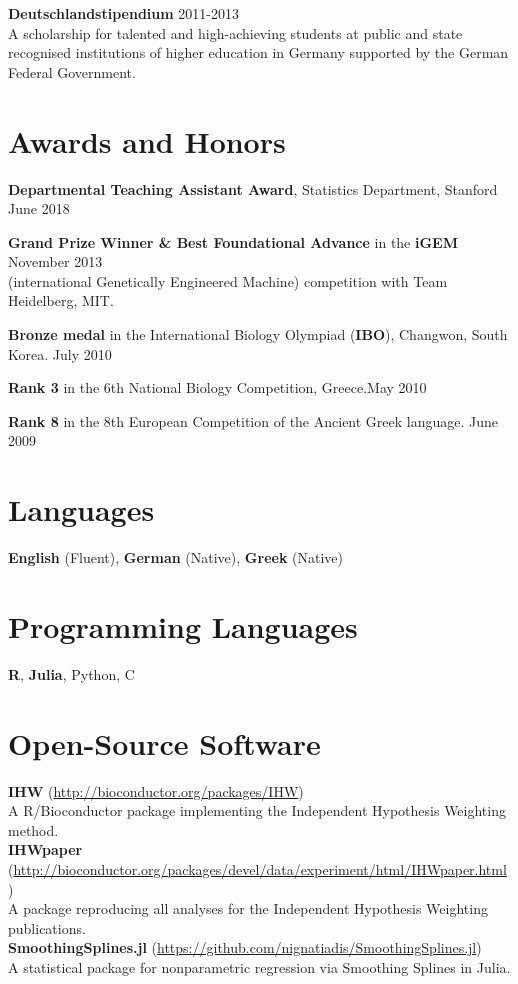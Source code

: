 \documentclass[margin,line]{res}
\newcommand{\ver}{\vspace*{-2.7mm}}
\begin{document}
\begin{resume}
\textbf{Deutschlandstipendium} \hfill 2011-2013\\
A scholarship for talented and high-achieving students at public and state recognised institutions of higher education in Germany supported by the German Federal Government.


\section{\sc Awards and Honors}
\textbf{Departmental Teaching Assistant Award}, Statistics Department, Stanford \hfill June 2018

\textbf{Grand Prize Winner \& Best Foundational Advance} in the \textbf{iGEM} \hfill November 2013 \\
(international Genetically Engineered Machine) competition with Team Heidelberg, MIT.

\ver
\textbf{Bronze medal} in the International Biology Olympiad (\textbf{IBO}), Changwon, South Korea. \hfill July 2010

\ver
\textbf{Rank 3} in the 6th National Biology Competition, Greece.\hfill May 2010
\ver

\textbf{Rank 8} in the 8th European Competition of the Ancient Greek language. \hfill June 2009




\section{\sc Languages}
\textbf{English} (Fluent), \textbf{German} (Native), \textbf{Greek} (Native)


\section{\sc Programming Languages}
\textbf{R}, \textbf{Julia}, Python, C


\section{\sc Open-Source Software}
\textbf{IHW} (\url{http://bioconductor.org/packages/IHW})\\ A R/Bioconductor package implementing the Independent Hypothesis Weighting method. \\
\textbf{IHWpaper} (\url{http://bioconductor.org/packages/devel/data/experiment/html/IHWpaper.html})\\
A package reproducing all analyses for the Independent Hypothesis Weighting publications.\\
\textbf{SmoothingSplines.jl} (\url{https://github.com/nignatiadis/SmoothingSplines.jl})\\
A statistical package for nonparametric regression via Smoothing Splines in Julia.

\end{resume}
\end{document}
